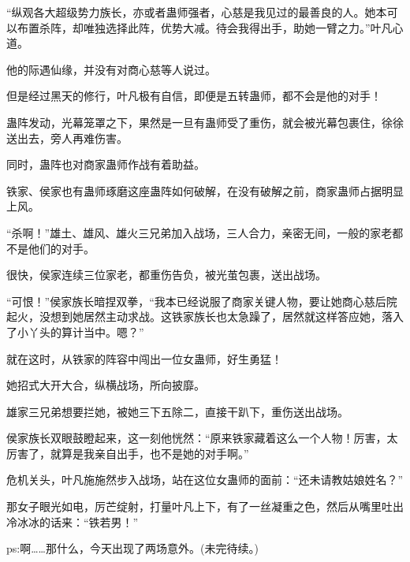 \begin{this_body}
“纵观各大超级势力族长，亦或者蛊师强者，心慈是我见过的最善良的人。她本可以布置杀阵，却唯独选择此阵，优势大减。待会我得出手，助她一臂之力。”叶凡心道。

他的际遇仙缘，并没有对商心慈等人说过。

但是经过黑天的修行，叶凡极有自信，即便是五转蛊师，都不会是他的对手！

蛊阵发动，光幕笼罩之下，果然是一旦有蛊师受了重伤，就会被光幕包裹住，徐徐送出去，旁人再难伤害。

同时，蛊阵也对商家蛊师作战有着助益。

铁家、侯家也有蛊师琢磨这座蛊阵如何破解，在没有破解之前，商家蛊师占据明显上风。

“杀啊！”雄土、雄风、雄火三兄弟加入战场，三人合力，亲密无间，一般的家老都不是他们的对手。

很快，侯家连续三位家老，都重伤告负，被光茧包裹，送出战场。

“可恨！”侯家族长暗捏双拳，“我本已经说服了商家关键人物，要让她商心慈后院起火，没想到她居然主动求战。这铁家族长也太急躁了，居然就这样答应她，落入了小丫头的算计当中。嗯？”

就在这时，从铁家的阵容中闯出一位女蛊师，好生勇猛！

她招式大开大合，纵横战场，所向披靡。

雄家三兄弟想要拦她，被她三下五除二，直接干趴下，重伤送出战场。

侯家族长双眼鼓瞪起来，这一刻他恍然：“原来铁家藏着这么一个人物！厉害，太厉害了，就算是我亲自出手，也不是她的对手啊。”

危机关头，叶凡施施然步入战场，站在这位女蛊师的面前：“还未请教姑娘姓名？”

那女子眼光如电，厉芒绽射，打量叶凡上下，有了一丝凝重之色，然后从嘴里吐出冷冰冰的话来：“铁若男！”

ps:啊……那什么，今天出现了两场意外。(未完待续。)

\end{this_body}


